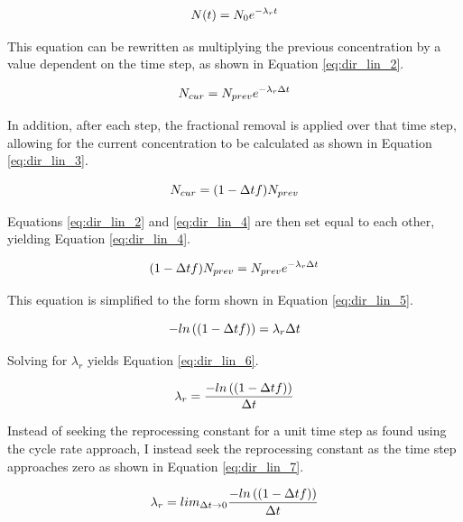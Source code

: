 \begin{equation} \hfill
N(t) = N_0 e^{-\lambda_r t}
\hfill\label{eq:dir_lin_1_2} \end{equation}

This equation can be rewritten as multiplying the previous concentration by a value dependent on the time step, as shown in Equation \eqref{eq:dir_lin_2}.

\begin{equation} \hfill
N_{cur} = N_{prev} e^{-\lambda_r \Delta t}
\hfill\label{eq:dir_lin_2} \end{equation}

In addition, after each step, the fractional removal is applied over that time step, allowing for the current concentration to be calculated as shown in Equation \eqref{eq:dir_lin_3}.

\begin{equation} \hfill
N_{cur} = (1 - \Delta t f) N_{prev}
\hfill\label{eq:dir_lin_3} \end{equation}

Equations \eqref{eq:dir_lin_2} and \eqref{eq:dir_lin_4} are then set equal to each other, yielding Equation \eqref{eq:dir_lin_4}.

\begin{equation} \hfill
(1 - \Delta t f) N_{prev} = N_{prev} e^{-\lambda_r \Delta t}
\hfill\label{eq:dir_lin_4} \end{equation}

This equation is simplified to the form shown in Equation \eqref{eq:dir_lin_5}.

\begin{equation} \hfill
-ln\left((1 - \Delta t f)\right) = \lambda_r \Delta t
\hfill\label{eq:dir_lin_5} \end{equation}

Solving for $\lambda_r$ yields Equation \eqref{eq:dir_lin_6}.

\begin{equation} \hfill
\lambda_r = \frac{-ln\left((1 - \Delta t f)\right)}{\Delta t}
\hfill\label{eq:dir_lin_6} \end{equation}

Instead of seeking the reprocessing constant for a unit time step as found using the cycle rate approach, I instead seek the reprocessing constant as the time step approaches zero as shown in Equation \eqref{eq:dir_lin_7}.

\begin{equation} \hfill
\lambda_r = lim_{\Delta t \to 0} \frac{-ln\left((1 - \Delta t f)\right)}{\Delta t}
\hfill\label{eq:dir_lin_7} \end{equation}

